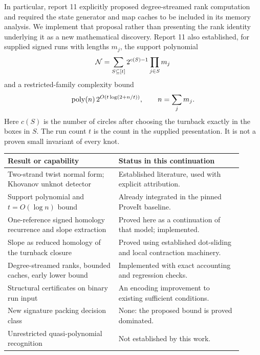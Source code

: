 In particular, report 11 explicitly proposed degree-streamed rank
computation and required the state generator and map caches to be included
in its memory analysis. We implement that proposal rather than presenting
the rank identity underlying it as a new mathematical discovery.
Report 11 also established, for supplied signed runs with lengths \(m_j\),
the support polynomial
\begin{equation}\label{eq:support}
\mathcal N=\sum_{S\subseteq[t]}2^{c(S)-1}\prod_{j\in S}m_j
\end{equation}
and a restricted-family complexity bound
\begin{equation}\label{eq:prior-bound}
\operatorname{poly}(n)\,2^{O(t\log(2+n/t))},\qquad n=\sum_jm_j.
\end{equation}
Here \(c(S)\) is the number of circles after choosing the turnback exactly
in the boxes in \(S\). The run count \(t\) is the count in the supplied
presentation. It is not a proven small invariant of every knot.

\begin{center}
\small
\begin{tabular}{p{0.43\linewidth}p{0.48\linewidth}}
\toprule
Result or capability & Status in this continuation\\
\midrule
Two-strand twist normal form; Khovanov unknot detector &
Established literature, used with explicit attribution.\\
Support polynomial and \(t=O(\log n)\) bound &
Already integrated in the pinned ProveIt baseline.\\
One-reference signed homology recurrence and slope extraction &
Proved here as a continuation of that model; implemented.\\
Slope as reduced homology of the turnback closure &
Proved using established dot-sliding and local contraction machinery.\\
Degree-streamed ranks, bounded caches, early lower bound &
Implemented with exact accounting and regression checks.\\
Structural certificates on binary run input &
An encoding improvement to existing sufficient conditions.\\
New signature packing decision class &
None: the proposed bound is proved dominated.\\
Unrestricted quasi-polynomial recognition &
Not established by this work.\\
\bottomrule
\end{tabular}
\end{center}

